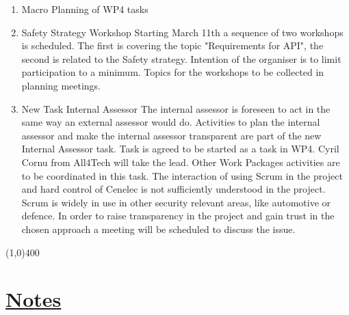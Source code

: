 \documentclass[a4paper]{article}
\begin{document}
\begin{enumerate}

\item Macro Planning of WP4 tasks\newline

\item Safety Strategy Workshop\newline
Starting March 11th a sequence of two workshops is scheduled. The first is covering the topic "Requirements for API", the second is related to the Safety strategy. Intention of the organiser is to limit participation to a minimum. Topics for the workshops to be collected in planning meetings. 

\item New Task Internal Assessor\newline
The internal assessor is foreseen to act in the same way an external assessor would do. Activities to plan the internal assessor and make the internal assessor transparent are part of the new Internal Assessor task. Task is agreed to be started as a task in WP4. Cyril Cornu from All4Tech will take the lead. Other Work Packages activities are to be coordinated in this task.\newline
The interaction of using Scrum in the project and hard control of Cenelec is not sufficiently understood in the project. Scrum is widely in use in other security relevant areas, like automotive or defence. In order to raise transparency in the project and gain trust in the chosen approach a meeting will be scheduled to discuss the issue.

\end{enumerate}

\line(1,0){400}
\section*{\underline{Notes}}
\end{document}
